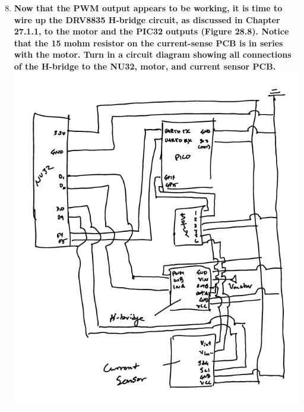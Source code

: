\documentclass{article}
\begin{document}
\begin{enumerate}[label=\textbf{\arabic*})]
    \setcounter{enumi}{7}
    \item \textbf{Now that the PWM output appears to be working, it is time to wire up the DRV8835
    H-bridge circuit, as discussed in Chapter 27.1.1, to the motor and the PIC32 outputs
    (Figure 28.8). Notice that the 15 mohm resistor on the current-sense PCB is in series with
    the motor. Turn in a circuit diagram showing all connections of the H-bridge to the
    NU32, motor, and current sensor PCB.} \\

    \includegraphics[width=\linewidth]{circuit_diagram.png}
\end{enumerate}
\end{document}
